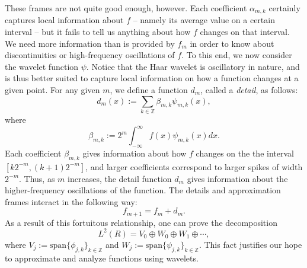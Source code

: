 These frames are not quite good enough, however. Each coefficient $\alpha_{m,k}$
certainly captures local information about $f$ -- namely its average value on
a certain interval -- but it fails to tell us anything about how $f$ changes
on that interval. We need more information than is provided by $f_m$ in order
to know about discontinuities or high-frequency oscillations of $f$. To this end,
we now consider the wavelet function $\psi$.
Notice that the Haar wavelet is oscillatory in nature, and is thus better suited
to capture local information on how a function changes at a given point. For
any given $m$, we define a function $d_m$, called a \emph{detail}, as follows:
\begin{equation*}
d_m(x) := \displaystyle\sum_{k \in \mathbb{Z}}\beta_{m,k}\psi_{m,k}(x),
\end{equation*}
where
\begin{equation*}
\beta_{m,k} := 2^m \displaystyle \int_{-\infty}^{\infty}f(x) \psi_{m,k}(x) dx.
\end{equation*}
Each coefficient $\beta_{m,k}$ gives information about how $f$ changes on the
the interval $[k2^{-m}, (k+1)2^{-m}]$, and larger coefficients correspond
to larger spikes of width $2^{-m}$. Thus, as $m$ increases, the
detail function $d_m$ gives information about the higher-frequency oscillations
of the function. The details and approximation frames interact in the following way:
\begin{equation*}
f_{m+1} = f_m + d_m.
\end{equation*}
As a result of this fortuitous relationship, one can prove the decomposition
\begin{equation*}
L^2(R) = V_0 \oplus W_0 \oplus W_1 \oplus \cdots,
\end{equation*}
where $V_j := \text{span}\{\phi_{j,k}\}_{k \in \mathbb{Z}}$ and
$W_j := \text{span}\{\psi_{j,k}\}_{k \in \mathbb{Z}}$. This fact justifies
our hope to approximate and analyze functions using wavelets.
